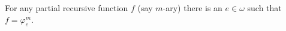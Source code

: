 For any partial recursive function $f$ (say $m$-ary) there is an $e \in \omega$ such that $f = \varphi_e^m$.
